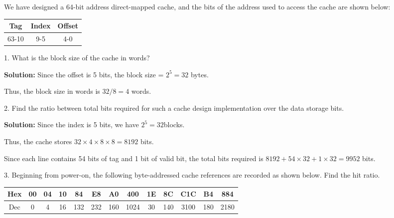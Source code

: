 \begin{eg}
We have designed a 64-bit address direct-mapped cache, and the bits of the address used to access the cache are shown below: 
\begin{table}[H]
  \centering
  \begin{tabular}{c|c|c}
      \toprule
      Tag & Index & Offset  \\
    \midrule
      63-10 & 9-5 & 4-0  \\
      \bottomrule
  \end{tabular}
\end{table}

1. What is the block size of the cache in words? 

\textbf{Solution:} Since the offset is 5 bits, the block size = \(2^5 = 32\) bytes. 

Thus, the block size in words is \(32 / 8 = 4\) words. 

2. Find the ratio between total bits required for such a cache design implementation over the data storage bits.

\textbf{Solution:} Since the index is 5 bits, we have \(2^5 = 32\)blocks. 

Thus, the cache stores \(32 \times 4 \times 8 \times 8 = 8192\) bits. 

Since each line contains 54 bits of tag and 1 bit of valid bit, the total bits required is \(8192 + 54 \times 32 + 1 \times 32 = 9952\) bits.

3. Beginning from power-on, the following byte-addressed cache references are recorded as shown below. Find the hit ratio.

\begin{table}[H]
  \centering
  \begin{tabular}{c|c|c|c|c|c|c|c|c|c|c|c|c}
      \toprule
      Hex  & 00 & 04 & 10 & 84 & E8 & A0 & 400 & 1E & 8C & C1C & B4 & 884  \\
    \midrule
      Dec  & 0 & 4 & 16 & 132 & 232 & 160 & 1024 & 30 & 140 & 3100 & 180 & 2180  \\
      \bottomrule
  \end{tabular}
\end{table}


\end{eg}
